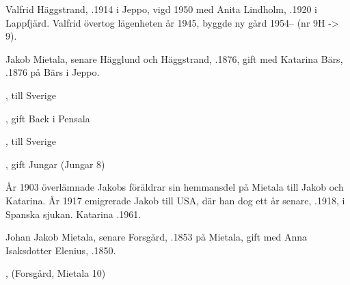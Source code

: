 Valfrid Häggstrand, .1914 i Jeppo, vigd 1950 med Anita Lindholm, .1920 i Lappfjärd. Valfrid övertog lägenheten år 1945, byggde ny gård 1954-- (nr 9H -> 9).\jhvspace{}


Jakob Mietala, senare Hägglund och Häggstrand, .1876, gift med Katarina Bärs, .1876 på Bärs i Jeppo.
\begin{jhchildren}
  \item {}
  \item {}, till Sverige
  \item {}
  \item {}, gift Back i Pensala
  \item {}, till Sverige
  \item {}, gift Jungar (Jungar 8)
  \item {}
  \item {}
\end{jhchildren}

År 1903 överlämnade Jakobs föräldrar sin hemmansdel på Mietala till Jakob och Katarina. År 1917 emigrerade Jakob till USA, där han dog ett år senare, .1918, i Spanska sjukan. Katarina .1961.


Johan Jakob Mietala, senare Forsgård, .1853 på Mietala, gift med Anna Isaksdotter Elenius, .1850.
\begin{jhchildren}
  \item {}
  \item {}
  \item {}
  \item {}
  \item {}
  \item {}
  \item {}, (Forsgård, Mietala 10)
\end{jhchildren}

